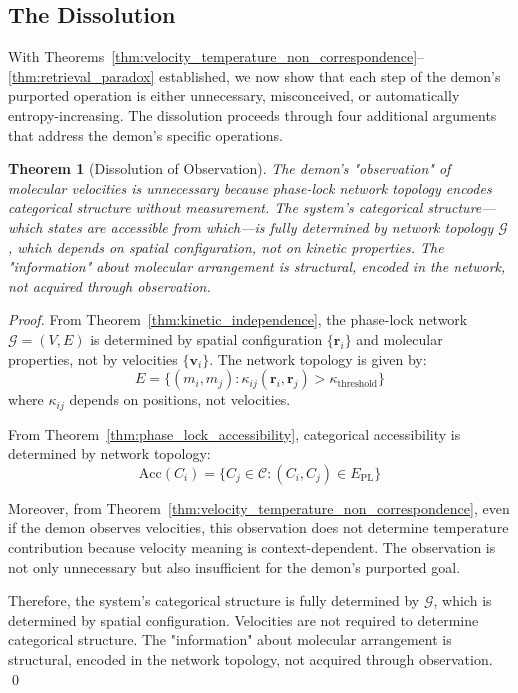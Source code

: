 \documentclass[12pt,a4paper]{article}
\newtheorem{theorem}{Theorem}[section]
\theoremstyle{definition}
\theoremstyle{remark}
\newcommand{\phaselockgraph}{\mathcal{G}}
\newcommand{\catspace}{\mathcal{C}}
\newcommand{\accessible}{\text{Acc}}
\begin{document}
\subsection{The Dissolution}

With Theorems~\ref{thm:velocity_temperature_non_correspondence}--\ref{thm:retrieval_paradox} established, we now show that each step of the demon's purported operation is either unnecessary, misconceived, or automatically entropy-increasing. The dissolution proceeds through four additional arguments that address the demon's specific operations.

\begin{theorem}[Dissolution of Observation]
\label{thm:dissolution_observation}
The demon's "observation" of molecular velocities is unnecessary because phase-lock network topology encodes categorical structure without measurement. The system's categorical structure—which states are accessible from which—is fully determined by network topology $\phaselockgraph$, which depends on spatial configuration, not on kinetic properties. The "information" about molecular arrangement is structural, encoded in the network, not acquired through observation.
\end{theorem}

\begin{proof}
From Theorem~\ref{thm:kinetic_independence}, the phase-lock network $\phaselockgraph = (V, E)$ is determined by spatial configuration $\{\mathbf{r}_i\}$ and molecular properties, not by velocities $\{\mathbf{v}_i\}$. The network topology is given by:
\begin{equation}
E = \{(m_i, m_j) : \kappa_{ij}(\mathbf{r}_i, \mathbf{r}_j) > \kappa_{\text{threshold}}\}
\end{equation}
where $\kappa_{ij}$ depends on positions, not velocities.

From Theorem~\ref{thm:phase_lock_accessibility}, categorical accessibility is determined by network topology:
\begin{equation}
\accessible(C_i) = \{C_j \in \catspace : (C_i, C_j) \in E_{\text{PL}}\}
\end{equation}

Moreover, from Theorem~\ref{thm:velocity_temperature_non_correspondence}, even if the demon observes velocities, this observation does not determine temperature contribution because velocity meaning is context-dependent. The observation is not only unnecessary but also insufficient for the demon's purported goal.

Therefore, the system's categorical structure is fully determined by $\phaselockgraph$, which is determined by spatial configuration. Velocities are not required to determine categorical structure. The "information" about molecular arrangement is structural, encoded in the network topology, not acquired through observation. \qed
\end{proof}
\end{document}
